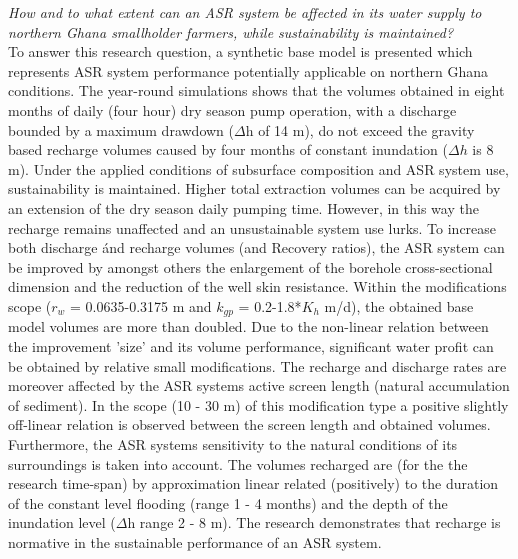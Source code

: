 \textit{How and to what extent can an ASR system be affected in its water supply to northern Ghana smallholder farmers, while sustainability is maintained?} 
\smallskip \\
To answer this research question, a synthetic base model is presented which represents ASR system performance potentially applicable on northern Ghana conditions. The year-round simulations shows that the volumes obtained in eight months of daily (four hour) dry season pump operation, with a discharge bounded by a maximum drawdown ($\Delta$h of 14 m), do not exceed the gravity based recharge volumes caused by four months of constant inundation ($\Delta h$ is 8 m). Under the applied conditions of subsurface composition and ASR system use, sustainability is maintained. Higher total extraction volumes can be acquired by an extension of the dry season daily pumping time. However, in this way the recharge remains unaffected and an unsustainable system use lurks. To increase both discharge ánd recharge volumes (and Recovery ratios), the ASR system can be improved by amongst others the enlargement of the borehole cross-sectional dimension and the reduction of the well skin resistance. Within the modifications scope ($r_w$ = 0.0635-0.3175 m and $k_{gp}$ = 0.2-1.8*$K_h$ m/d), the obtained base model volumes are more than doubled. Due to the non-linear relation between the improvement 'size' and its volume performance, significant water profit can be obtained by relative small modifications. The recharge and discharge rates are moreover affected by the ASR systems active screen length (natural accumulation of sediment). In the scope (10 - 30 m) of this modification type a positive slightly off-linear relation is observed between the screen length and obtained volumes. 
Furthermore, the ASR systems sensitivity to the natural conditions of its surroundings is taken into account. The volumes recharged are (for the the research time-span) by approximation linear related (positively) to the duration of the constant level flooding (range 1 - 4 months) and the depth of the inundation level ($\Delta$h range 2 - 8 m). The research demonstrates that recharge is normative in the sustainable performance of an ASR system. \\


